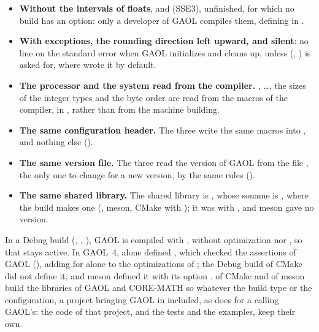 \documentclass[12pt,a4paper,twoside,openright]{book}
\begin{document}
\begin{itemize}
  and the one of clang-cl needs the runtime library of LLVM: both tell the
  processor by  and .\newinvfive
{}%
\item[$\bullet$] \textbf{Without the intervals of floats},
   and  (SSE3), unfinished, for
  which no build has an option: only a developer of GAOL compiles them,
  defining  in .
\item[$\bullet$] \textbf{With exceptions, the rounding direction left upward,
  and silent}: no line on the standard error when GAOL initializes and cleans
  up, unless  (,
  ) is asked for, where 
  wrote it by default.\newinvfive
\item[$\bullet$] \textbf{The processor and the system read from the
  compiler.} , \ldots, the
  sizes of the integer types and the byte order are read from the macros of
  the compiler, in , rather than from the machine
  building.
\item[$\bullet$] \textbf{The same configuration header.} The three write the
  same macros into , and nothing else
  ().\newinvfive
\item[$\bullet$] \textbf{The same version file.} The three read the version
  of GAOL from the file , the only one to change for a new
  version, by the same rules ().\newinvfive
\item[$\bullet$] \textbf{The same shared library.} The shared library is
  , whose soname is , where the
  build makes one (, meson, CMake with
  ); it was  with
  , and meson gave no version.\newinvfive
{}%
\end{itemize}

\medskip
In a Debug build (,
, ), GAOL is
compiled with , without optimization nor , so that
 stays active. In GAOL~4,  alone
defined , which checked the assertions of GAOL
(), adding  for
 alone to the optimizations of ; the Debug
build of CMake did not define it, and meson defined it with its option
.\newinvfive{}  of CMake and
 of meson build the libraries of GAOL and CORE-MATH so
whatever the build type or the configuration, a project bringing GAOL in
included, as  does for a  calling
GAOL's: the code of that project, and the tests and the examples, keep their
own.
\end{document}
